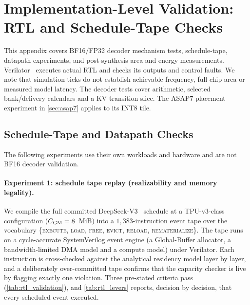 \section{Implementation-Level Validation: RTL and Schedule-Tape Checks}
\label{sec:rtl_validation}

This appendix covers BF16/FP32 decoder mechanism tests, schedule-tape, datapath experiments, and post-synthesis area and energy measurements.
Verilator~\citep{snyder_verilator} executes actual RTL and checks its outputs and control faults.
We note that simulation ticks do not establish achievable frequency, full-chip area or measured model latency.
The decoder tests cover arithmetic, selected bank/delivery calendars and a KV transition slice.
The ASAP7 placement experiment in \cref{sec:asap7} applies to its INT8 tile.



\subsection{Schedule-Tape and Datapath Checks}\label{app:tape_checks}
The following experiments use their own workloads and hardware and are not BF16 decoder validation.

\paragraph{Experiment 1: schedule tape replay (realizability and memory legality).}
We compile the full committed DeepSeek-V3~\citep{deepseekv3report} schedule at a TPU-v3-class configuration ($C_{\text{GM}}=8$~MiB) into a $1{,}383$-instruction event tape over the vocabulary \{\textsc{execute}, \textsc{load}, \textsc{free}, \textsc{evict}, \textsc{reload}, \textsc{rematerialize}\}.
The tape runs on a cycle-accurate SystemVerilog event engine (a Global-Buffer allocator, a bandwidth-limited DMA model and a compute model) under Verilator.
Each instruction is cross-checked against the analytical residency model layer by layer, and a deliberately over-committed tape confirms that the capacity checker is live by flagging exactly one violation.
Three pre-stated criteria pass (\cref{tab:rtl_validation}), and \cref{tab:rtl_levers} reports, decision by decision, that every scheduled event executed.

